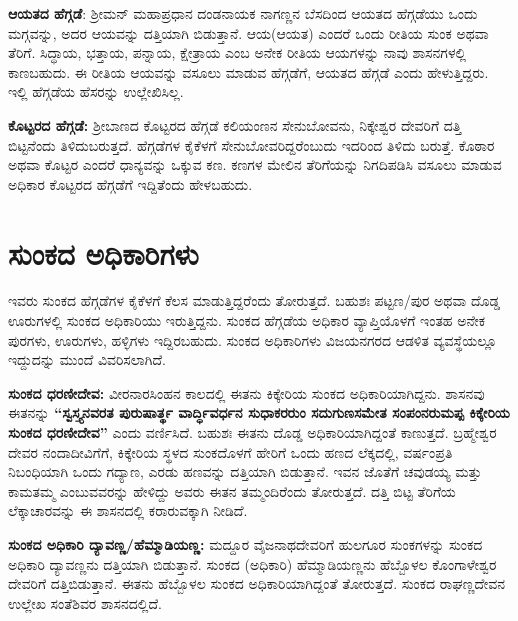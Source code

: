 \textbf{ಆಯತದ ಹೆಗ್ಗಡೆ}: ಶ‍್ರೀಮನ್​ ಮಹಾಪ್ರಧಾನ ದಂಡನಾಯಕ ನಾಗಣ್ಣನ ಬೆಸದಿಂದ ಆಯತದ ಹೆಗ್ಗಡೆಯು ಒಂದು ಮಗ್ಗವನ್ನು, ಅದರ ಆಯವನ್ನು ದತ್ತಿಯಾಗಿ ಬಿಡುತ್ತಾನೆ. ಆಯ(ಆಯತ) ಎಂದರೆ ಒಂದು ರೀತಿಯ ಸುಂಕ ಅಥವಾ ತೆರಿಗೆ. ಸಿದ್ಧಾಯ, ಭತ್ತಾಯ, ಪನ್ನಾಯ, ಕ್ಷೇತ್ರಾಯ ಎಂಬ ಅನೇಕ ರೀತಿಯ ಆಯಗಳನ್ನು ನಾವು ಶಾಸನಗಳಲ್ಲಿ ಕಾಣಬಹುದು. ಈ ರೀತಿಯ ಆಯವನ್ನು ವಸೂಲು ಮಾಡುವ ಹೆಗ್ಗಡೆಗೆ, ಆಯತದ ಹೆಗ್ಗಡೆ ಎಂದು ಹೇಳುತ್ತಿದ್ದರು. ಇಲ್ಲಿ ಹೆಗ್ಗಡೆಯ ಹೆಸರನ್ನು ಉಲ್ಲೇಖಿಸಿಲ್ಲ.

\textbf{ಕೊಟ್ಟರದ ಹೆಗ್ಗಡೆ: }ಶ‍್ರೀಬಾಣದ ಕೊಟ್ಟರದ ಹೆಗ್ಗಡೆ ಕಲಿಯಂಣನ ಸೇನುಬೋವನು, ನಿಕ್ಕೇಶ್ವರ ದೇವರಿಗೆ ದತ್ತಿ ಬಿಟ್ಟನೆಂದು ತಿಳಿದುಬರುತ್ತದೆ. ಹೆಗ್ಗಡೆಗಳ ಕೈಕೆಳಗೆ ಸೇನುಬೋವರಿದ್ದರೆಂಬುದು ಇದರಿಂದ ತಿಳಿದು ಬರುತ್ತೆ. ಕೊಠಾರ ಅಥವಾ ಕೊಟ್ಟರ ಎಂದರೆ ಧಾನ್ಯವನ್ನು ಒಕ್ಕುವ ಕಣ. ಕಣಗಳ ಮೇಲಿನ ತೆರಿಗೆಯನ್ನು ನಿಗದಿಪಡಿಸಿ ವಸೂಲು ಮಾಡುವ ಅಧಿಕಾರ ಕೊಟ್ಟರದ ಹೆಗ್ಗಡೆಗೆ ಇದ್ದಿತೆಂದು ಹೇಳಬಹುದು.

\newpage

\section{ಸುಂಕದ ಅಧಿಕಾರಿಗಳು}

ಇವರು ಸುಂಕದ ಹೆಗ್ಗಡೆಗಳ ಕೈಕೆಳಗೆ ಕೆಲಸ ಮಾಡುತ್ತಿದ್ದರೆಂದು ತೋರುತ್ತದೆ. ಬಹುಶಃ ಪಟ್ಟಣ/ಪುರ ಅಥವಾ ದೊಡ್ಡ ಊರುಗಳಲ್ಲಿ ಸುಂಕದ ಅಧಿಕಾರಿಯು ಇರುತ್ತಿದ್ದನು. ಸುಂಕದ ಹೆಗ್ಗಡೆಯ ಅಧಿಕಾರ ವ್ಯಾಪ್ತಿಯೊಳಗೆ ಇಂತಹ ಅನೇಕ ಪುರಗಳು, ಊರುಗಳು, ಹಳ್ಳಿಗಳು ಇದ್ದಿರಬಹುದು. ಸುಂಕದ ಅಧಿಕಾರಿಗಳು ವಿಜಯನಗರದ ಆಡಳಿತ ವ್ಯವಸ್ಥೆಯಲ್ಲೂ ಇದ್ದುದನ್ನು ಮುಂದೆ ವಿವರಿಸಲಾಗಿದೆ.

\textbf{ಸುಂಕದ ಧರಣೀದೇವ:} ವೀರನಾರಸಿಂಹನ ಕಾಲದಲ್ಲಿ ಈತನು ಕಿಕ್ಕೇರಿಯ ಸುಂಕದ ಅಧಿಕಾರಿಯಾಗಿದ್ದನು. ಶಾಸನವು ಈತನನ್ನು \textbf{“ಸ್ವಸ್ತ್ಯನವರತ ಪುರುಷಾರ್ತ್ಥ ವಾರ್ದ್ಧಿವರ್ಧನ ಸುಧಾಕರರುಂ ಸದುಗುಣಸಮೇತ ಸಂಪಂನರುಮಪ್ಪ ಕಿಕ್ಕೇರಿಯ ಸುಂಕದ ಧರಣೀದೇವ”} ಎಂದು ವರ್ಣಿಸಿದೆ. ಬಹುಶಃ ಈತನು ದೊಡ್ಡ ಅಧಿಕಾರಿಯಾಗಿದ್ದಂತೆ ಕಾಣುತ್ತದೆ. ಬ್ರಹ್ಮೇಶ್ವರ ದೇವರ ನಂದಾದೀವಿಗೆಗೆ, ಕಿಕ್ಕೇರಿಯ ಸ್ಥಳದ ಸುಂಕದೊಳಗೆ ಹೇರಿಗೆ ಒಂದು ಹಣದ ಲೆಕ್ಕದಲ್ಲಿ, ವರ್ಷಂಪ್ರತಿ ನಿಬಂಧಿಯಾಗಿ ಒಂದು ಗದ್ಯಾಣ, ಎರಡು ಹಣವನ್ನು ದತ್ತಿಯಾಗಿ ಬಿಡುತ್ತಾನೆ. ಇವನ ಜೊತೆಗೆ ಚವುಡಯ್ಯ ಮತ್ತು ಕಾಮತಮ್ಮ ಎಂಬುವವರನ್ನು ಹೇಳಿದ್ದು ಅವರು ಈತನ ತಮ್ಮಂದಿರೆಂದು ತೋರುತ್ತದೆ. ದತ್ತಿ ಬಿಟ್ಟ ತೆರಿಗೆಯ ಲೆಕ್ಕಾಚಾರವನ್ನು ಈ ಶಾಸನದಲ್ಲಿ ಕರಾರುವಕ್ಕಾಗಿ ನೀಡಿದೆ.

\textbf{ಸುಂಕದ ಅಧಿಕಾರಿ ದ್ಯಾವಣ್ಣ/ಹೆಮ್ಮಾಡಿಯಣ್ಣ:} ಮದ್ದೂರ ವೈಜನಾಥದೇವರಿಗೆ ಹುಲಗೂರ ಸುಂಕಗಳನ್ನು ಸುಂಕದ ಅಧಿಕಾರಿ ದ್ಯಾವಣ್ಣನು ದತ್ತಿಯಾಗಿ ಬಿಡುತ್ತಾನೆ. ಸುಂಕದ (ಅಧಿಕಾರಿ) ಹೆಮ್ಮಾಡಿಯಣ್ಣನು ಹೆಬ್ಬೊಳಲ ಕೊಂಗಾಳೇಶ್ವರ ದೇವರಿಗೆ ದತ್ತಿಬಿಡುತ್ತಾನೆ. ಈತನು ಹೆಬ್ಬೊಳಲ ಸುಂಕದ ಅಧಿಕಾರಿಯಾಗಿದ್ದಂತೆ ತೋರುತ್ತದೆ. ಸುಂಕದ ರಾಘಣ್ಣದೇವನ ಉಲ್ಲೇಖ ಸಂತೆಶಿವರ ಶಾಸನದಲ್ಲಿದೆ.


